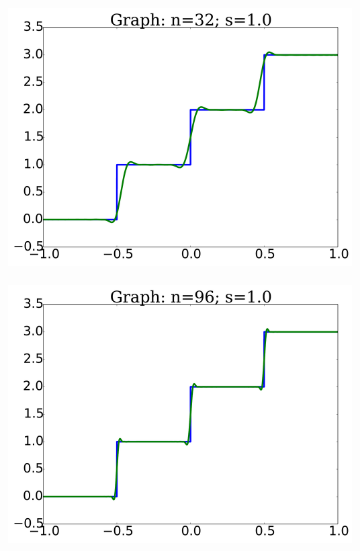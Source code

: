 
\begin{figure}[p]
    \centering
    \begin{subfigure}{0.45\textwidth}
    \includegraphics[width=\textwidth]{plots/graph_n_32_s_1_heaviside_2.pdf}
    \end{subfigure}
    \begin{subfigure}{0.45\textwidth}
    \includegraphics[width=\textwidth]{plots/graph_n_96_s_1_heaviside_2.pdf}
    \end{subfigure}


\end{figure}
